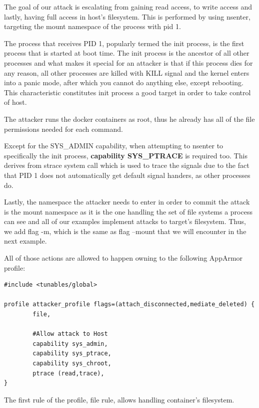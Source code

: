 The goal of our attack is escalating from gaining read access, to write access and lastly, having full access in host's filesystem. This is performed by using nsenter, targeting the mount namespace of the process with pid 1.

The process that receives PID 1, popularly termed the init process, is the first process that is started at boot time. The init process is the ancestor of all other processes and what makes it special for an attacker is that if this process dies for any reason, all other processes are killed with KILL signal and the kernel enters into a panic mode, after which you cannot do anything else, except rebooting. This characteristic constitutes init process a good target in order to take control of host.

The attacker runs the docker containers as root, thus he already has all of the file permissions needed for each command.

Except for the SYS\_ADMIN capability, when attempting to nsenter to specifically the init process, \textbf{capability SYS\_PTRACE} is required too. This derives from strace system call which is used to trace the signals due to the fact that PID 1 does not automatically get default signal handers, as other processes do.

Lastly, the namespace the attacker needs to enter in order to commit the attack is the mount namespace as it is the one handling the set of file systems a process can see and all of our examples implement attacks to target's filesystem. Thus, we add flag -m, which is the same as flag --mount that we will encounter in the next example.

All of those actions are allowed to happen owning to the following AppArmor profile:
\hfill\break
\begin{lstlisting}[style=Dockerfile, caption={AppArmor profile attacker\_profile}]
#include <tunables/global>

profile attacker_profile flags=(attach_disconnected,mediate_deleted) {
        file, 

        #Allow attack to Host
        capability sys_admin,
        capability sys_ptrace,
        capability sys_chroot,
        ptrace (read,trace),
}
\end{lstlisting}

The first rule of the profile, file rule, allows handling container's filesystem.


